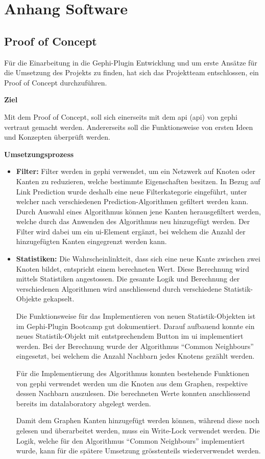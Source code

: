 \chapter{Anhang Software}

\section{Proof of Concept}
\label{poc}

Für die Einarbeitung in die Gephi-Plugin Entwicklung und um erste Ansätze für die Umsetzung des Projekts zu finden, hat
sich das Projektteam entschlossen, ein Proof of Concept durchzuführen.

\textbf{Ziel}

Mit dem Proof of Concept, soll sich einerseits mit dem \acl{api} (\acs{api}) von \acs{gephi} vertraut gemacht werden.
Andererseits soll die Funktionsweise von ersten Ideen und Konzepten überprüft werden.

\textbf{Umsetzungsprozess}

\begin{itemize}
    \item \textbf{Filter:} Filter werden in \acs{gephi} verwendet, um ein Netzwerk auf Knoten oder Kanten zu reduzieren, welche bestimmte Eigenschaften besitzen.
    In Bezug auf Link Prediction wurde deshalb eine neue Filterkategorie eingeführt, unter welcher nach verschiedenen Prediction-Algorithmen gefiltert werden kann.
    Durch Auswahl eines Algorithmus können jene Kanten herausgefiltert werden, welche durch das Anwenden des Algorithmus neu hinzugefügt werden.
    Der Filter wird dabei um ein \acs{ui}-Element ergänzt, bei welchem die Anzahl der hinzugefügten Kanten eingegrenzt werden kann.

    \item \textbf{Statistiken:} Die Wahrscheinlinkteit, dass sich eine neue Kante zwischen zwei Knoten bildet, entspricht einem berechneten Wert.
    Diese Berechnung wird mittels Statistiken angestossen. Die gesamte Logik und Berechnung der verschiedenen Algorithmen wird anschliessend
    durch verschiedene Sta\-tis\-tik-Ob\-jek\-te gekapselt.

    Die Funktionsweise für das Implementieren von neuen Sta\-tis\-tik-Ob\-jek\-ten ist im Gephi-Plugin Bootcamp gut dokumentiert. Darauf aufbauend
    konnte ein neues Statistik-Objekt mit entstprechendem Button im \acs{ui} implementiert werden. Bei der Berechnung wurde der Algorithmus
    ``Common Neighbours'' eingesetzt, bei welchem die Anzahl Nachbarn jedes Knotens gezählt werden.

    Für die Implementierung des Algorithmus konnten bestehende Funktionen von \acs{gephi} verwendet werden um die Knoten aus dem Graphen, respektive
    dessen Nachbarn auszulesen. Die berechneten Werte konnten anschliessend bereits im \acs{datalaboratory} abgelegt werden.

    Damit dem Graphen Kanten hinzugefügt werden können, während diese noch gelesen und überarbeitet werden, muss ein Write-Lock
    verwendet werden. Die Logik, welche für den Algorithmus ``Common Neighbours'' implementiert wurde, kann für die spätere Umsetzung
    grösstenteils wiederverwendet werden.
\end{itemize}

